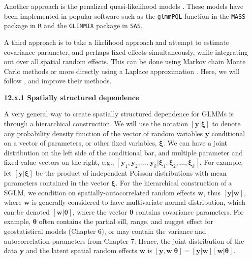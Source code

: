 \documentclass[12pt, titlepage]{article}
\begin{document}
Another approach is the penalized quasi-likelihood models \citep{breslow_approximate_1993, WolfingerEtAl1993GeneralizedLinearMixed233}.  These models have been implemented in popular software such as the \texttt{glmmPQL} function in the \texttt{MASS} package in \texttt{R} and the \texttt{GLIMMIX} package in \texttt{SAS}.

A third approach is to take a likelihood approach and attempt to estimate covariance parameter, and perhaps fixed effects simultaneously, while integrating out over all spatial random effects.   This can be done using Markov chain Monte Carlo methods \citep[e.g.,][]{christensen_monte_2004} or more directly using a Laplace approximation \citep[e.g.,][]{evangelou_estimation_2011, bonat_practical_2016}.  Here, we will follow \citet{bonat_practical_2016}, and improve their methods.





{\large \flushleft \textbf{12.x.1 Spatially structured dependence}}

A very general way to create spatially structured dependence for GLMMs is through a hierarchical construction.  We will use the notation $[\mathbf{y}|\boldsymbol{\xi}]$ to denote any probability density function of the vector of random variables $\mathbf{y}$ conditional on a vector of parameters, or other fixed variables, $\boldsymbol{\xi}$. We can have a joint distribution on the left side of the conditional bar, and multiple parameter and fixed value vectors on the right, e.g., $[\mathbf{y}_{1},\mathbf{y}_{2}, \ldots, \mathbf{y}_{k} | \boldsymbol{\xi}_{1}, \boldsymbol{\xi}_{2}, \ldots, \boldsymbol{\xi}_{k}]$. For example, let $[\mathbf{y}|\boldsymbol{\xi}]$ be the product of independent Poisson distributions with mean parameters contained in the vector $\boldsymbol{\xi}$.  For the hierarchical construction of a SGLM, we condition on spatially-autocorrelated random effects $\mathbf{w}$, thus $[\mathbf{y}|\mathbf{w}]$, where $\mathbf{w}$ is generally considered to have multivariate normal distribution, which can be denoted $[\mathbf{w}|\boldsymbol{\theta}]$, where the vector $\boldsymbol{\theta}$ contains covariance parameters.  For example, $\boldsymbol{\theta}$ often contains the partial sill, range, and nugget effect for geostatistical models (Chapter 6), or may contain the variance and autocorrelation parameters from Chapter 7.  Hence, the joint distribution of the data $\mathbf{y}$ and the latent spatial random effects $\mathbf{w}$ is $[\mathbf{y},\mathbf{w}|\boldsymbol{\theta}] = [\mathbf{y}|\mathbf{w}][\mathbf{w}|\boldsymbol{\theta}]$.  
\end{document}
